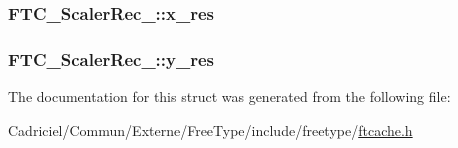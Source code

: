 \hypertarget{struct_f_t_c___scaler_rec___a886c7c1230dc5d5e6b3fc32d06274752}{
\subsubsection[{x\-\_\-res}]{ F\-T\-C\-\_\-\-Scaler\-Rec\-\_\-\-::x\-\_\-res}}\label{struct_f_t_c___scaler_rec___a886c7c1230dc5d5e6b3fc32d06274752}
\hypertarget{struct_f_t_c___scaler_rec___accb53c7a9aeebb41c05f48d14d3dfe71}{
\subsubsection[{y\-\_\-res}]{ F\-T\-C\-\_\-\-Scaler\-Rec\-\_\-\-::y\-\_\-res}}\label{struct_f_t_c___scaler_rec___accb53c7a9aeebb41c05f48d14d3dfe71}


The documentation for this struct was generated from the following file\-:\begin{DoxyCompactItemize}
\item 
Cadriciel/\-Commun/\-Externe/\-Free\-Type/include/freetype/\hyperlink{ftcache_8h}{ftcache.\-h}\end{DoxyCompactItemize}
